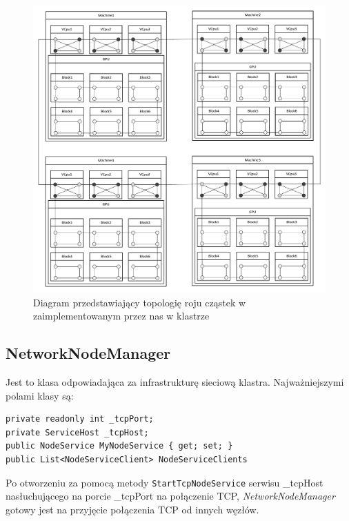 \documentclass[12pt, twoside, openany, abstract=on]{report}
\theoremstyle{definition}
\begin{document}
\begin{figure}[H]
    \centering
    \includegraphics[scale=0.5]{wholeClusterNew.pdf} 
 \caption{Diagram przedstawiający topologię roju cząstek w zaimplementowanym przez nas w klastrze}
 \label{fig:wholeCluster}
\end{figure}


\subsection{NetworkNodeManager}
Jest to klasa odpowiadająca za infrastrukturę sieciową klastra. Najważniejszymi polami klasy są:

\lstset{style=sharpc}
\begin{lstlisting}[frame=single]
private readonly int _tcpPort;
private ServiceHost _tcpHost;
public NodeService MyNodeService { get; set; }
public List<NodeServiceClient> NodeServiceClients
\end{lstlisting}

Po otworzeniu za pomocą metody \texttt{StartTcpNodeService} serwisu \_tcpHost nasłuchującego na porcie \_tcpPort na połączenie TCP, \textit{NetworkNodeManager} gotowy jest na przyjęcie połączenia TCP od innych węzłów. 
\end{document}
